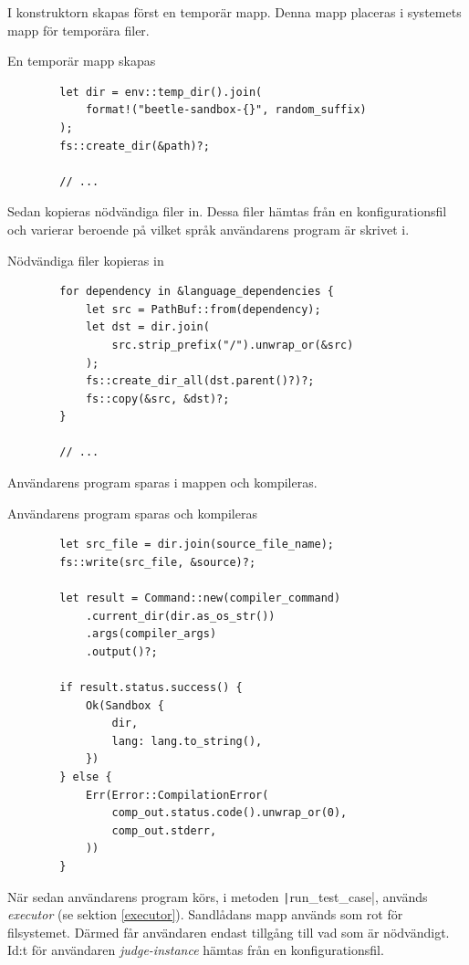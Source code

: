 \documentclass{article}
\begin{document}
I konstruktorn skapas först en temporär mapp. Denna mapp placeras i systemets
mapp för temporära filer.

\begin{listing}[H]
	\caption{En temporär mapp skapas}
	\begin{verbatim}
		let dir = env::temp_dir().join(
			format!("beetle-sandbox-{}", random_suffix)
		);
		fs::create_dir(&path)?;

		// ...
	\end{verbatim}
\end{listing}

Sedan kopieras nödvändiga filer in. Dessa filer hämtas från en
konfigurationsfil och varierar beroende på vilket språk användarens program är
skrivet i.

\begin{listing}[H]
	\caption{Nödvändiga filer kopieras in}
	\begin{verbatim}
		for dependency in &language_dependencies {
			let src = PathBuf::from(dependency);
			let dst = dir.join(
				src.strip_prefix("/").unwrap_or(&src)
			);
			fs::create_dir_all(dst.parent()?)?;
			fs::copy(&src, &dst)?;
		}

		// ...
	\end{verbatim}
\end{listing}

Användarens program sparas i mappen och kompileras.

\begin{listing}[H]
	\caption{Användarens program sparas och kompileras}
	\begin{verbatim}
		let src_file = dir.join(source_file_name);
		fs::write(src_file, &source)?;

		let result = Command::new(compiler_command)
			.current_dir(dir.as_os_str())
			.args(compiler_args)
			.output()?;

		if result.status.success() {
			Ok(Sandbox {
				dir,
				lang: lang.to_string(),
			})
		} else {
			Err(Error::CompilationError(
				comp_out.status.code().unwrap_or(0),
				comp_out.stderr,
			))
		}
	\end{verbatim}
\end{listing}

När sedan användarens program körs, i metoden
\texttt|run_test_case|, används
\textit{executor} (se sektion \ref{executor}). Sandlådans mapp används som rot
för filsystemet. Därmed får användaren endast tillgång till vad som är
nödvändigt. Id:t för användaren \textit{judge-instance} hämtas från en
konfigurationsfil.
\end{document}
